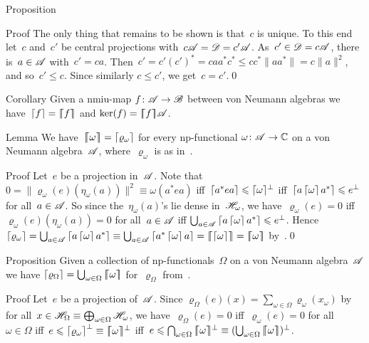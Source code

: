 \documentclass[a]{subfiles}
\begin{document}
\begin{parsec}
\begin{point}{Proposition}
\begin{point}{Proof}
The only thing that remains to be shown is that~$c$
is unique.
To this end let~$c$ and~$c'$ be central projections 
with~$c\mathscr{A} = \mathscr{D}=c'\mathscr{A}$.
As~$c'\in\mathscr{D}=c \mathscr{A}$,
there is~$a\in \mathscr{A}$
with~$c' = ca$.
Then~$c' = c'(c')^* = caa^*c^*\leq 
cc^*\|aa^*\|=c\|a\|^2$,
and so~$c'\leq c$.
Since similarly $c\leq c'$, we get~$c=c'$.\qed
\end{point}
\end{point}
\begin{point}{Corollary}%
Given a nmiu-map $f\colon \mathscr{A}\to\mathscr{B}$
between von Neumann algebras
we have~$\left\lceil f\right\rceil=\left\lceil\!\!\left\lceil f\right\rceil\!\!\right\rceil$
and $\ker(f)=\left\lceil\!\!\left\lceil f\right\rceil\!\!\right\rceil\!\mathscr{A}$.
\end{point}
\begin{point}{Lemma}%
We have~$\left\lceil\!\!\left\lceil\omega\right\rceil\!\!\right\rceil=
\left\lceil\varrho_\omega\right\rceil$
for every np-functional $\omega\colon \mathscr{A}\to\mathbb{C}$
on a von Neumann algebra~$\mathscr{A}$,
where~$\varrho_\omega$
is as in~.
\begin{point}{Proof}%
Let~$e$ be a projection in~$\mathscr{A}$.
Note that $0=\|\varrho_\omega(e)(\eta_\omega(a))\|^2
\equiv \omega(a^*ea)$
iff~$\left\lceil a^*ea\right\rceil\leqslant \smash{\left\lceil\omega\right\rceil}^\perp$
iff~$\left\lceil a\left\lceil\omega\right\rceil a^*\right\rceil\leqslant e^\perp$
for all~$a\in\mathscr{A}$.
So since the~$\eta_\omega(a)$'s lie dense in~$\mathscr{H}_\omega$,
we have~$\varrho_\omega(e)=0$
iff $\varrho_\omega(e)(\eta_\omega(a))=0$ for all~$a\in\mathscr{A}$
iff $\bigcup_{a\in\mathscr{A}} \left\lceil a\left\lceil\omega\right\rceil a^*\right\rceil\leqslant e^\perp$.
Hence $\ceil{\varrho_\omega}=
\bigcup_{a\in\scrA}
\ceil{a\ceil{\omega}a^*} \equiv
\bigcup_{a\in\scrA}
\ceil{a^*\ceil{\omega}a}
=\cceil{\ceil{\omega}}
=\cceil{\omega}$
by~.\qed
\end{point}
\end{point}
\begin{point}{Proposition}%
Given a collection of np-functionals~$\Omega$
on a von Neumann algebra~$\mathscr{A}$
we have $\left\lceil\varrho_\Omega\right\rceil
=\bigcup_{\omega\in\Omega} \left\lceil\!\!\left\lceil\omega\right\rceil\!\!\right\rceil$
for~$\varrho_\Omega$
from~.
\begin{point}{Proof}%
Let~$e$ be a projection of~$\mathscr{A}$.
Since
$\varrho_\Omega(e)(x)
= \sum_{\omega\in\Omega} \varrho_\omega(x_\omega)$
by~
for all~$x\in\mathscr{H}_\Omega\equiv\bigoplus_{\omega\in\Omega}\mathscr{H}_\omega$,
we have~$\varrho_\Omega(e)=0$
iff~$\varrho_\omega(e)=0$ for all~$\omega\in\Omega$
iff~$e\leqslant \smash{\left\lceil\varrho_\omega\right\rceil^\perp \equiv 
\smash{\left\lceil\!\!\left\lceil\omega\right\rceil\!\!\right\rceil}^\perp}$
iff~$e\leq \bigcap_{\omega\in\Omega}\smash{\cceil{\omega}}^\perp 
\equiv (\bigcup_{\omega\in\Omega} \cceil{\omega})^\perp$.

\end{point}
\end{point}
\end{parsec}
\end{document}
